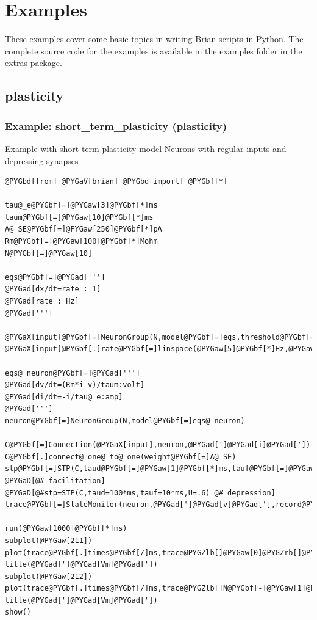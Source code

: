 \documentclass[letterpaper,10pt,english]{manual}
\begin{document}
\section{Examples}

These examples cover some basic topics in writing Brian scripts in Python. The
complete source code for the examples is available in the examples folder
in the extras package.


\subsection{plasticity}

\resetcurrentobjects
\hypertarget{--doc-examples-plasticity_short_term_plasticity}{}

\hypertarget{index-99}{}\subsubsection{Example: short\_term\_plasticity (plasticity)}

Example with short term plasticity model
Neurons with regular inputs and depressing synapses

\begin{Verbatim}[commandchars=@\[\]]
@PYGbd[from] @PYGaV[brian] @PYGbd[import] @PYGbf[*]

tau@_e@PYGbf[=]@PYGaw[3]@PYGbf[*]ms
taum@PYGbf[=]@PYGaw[10]@PYGbf[*]ms
A@_SE@PYGbf[=]@PYGaw[250]@PYGbf[*]pA
Rm@PYGbf[=]@PYGaw[100]@PYGbf[*]Mohm
N@PYGbf[=]@PYGaw[10]

eqs@PYGbf[=]@PYGad[''']
@PYGad[dx/dt=rate : 1]
@PYGad[rate : Hz]
@PYGad[''']

@PYGaX[input]@PYGbf[=]NeuronGroup(N,model@PYGbf[=]eqs,threshold@PYGbf[=]@PYGaw[1.],reset@PYGbf[=]@PYGaw[0])
@PYGaX[input]@PYGbf[.]rate@PYGbf[=]linspace(@PYGaw[5]@PYGbf[*]Hz,@PYGaw[30]@PYGbf[*]Hz,N)

eqs@_neuron@PYGbf[=]@PYGad[''']
@PYGad[dv/dt=(Rm*i-v)/taum:volt]
@PYGad[di/dt=-i/tau@_e:amp]
@PYGad[''']
neuron@PYGbf[=]NeuronGroup(N,model@PYGbf[=]eqs@_neuron)

C@PYGbf[=]Connection(@PYGaX[input],neuron,@PYGad[']@PYGad[i]@PYGad['])
C@PYGbf[.]connect@_one@_to@_one(weight@PYGbf[=]A@_SE)
stp@PYGbf[=]STP(C,taud@PYGbf[=]@PYGaw[1]@PYGbf[*]ms,tauf@PYGbf[=]@PYGaw[100]@PYGbf[*]ms,U@PYGbf[=]@PYGbf[.]@PYGaw[1]) @PYGaD[@# facilitation]
@PYGaD[@#stp=STP(C,taud=100*ms,tauf=10*ms,U=.6) @# depression]
trace@PYGbf[=]StateMonitor(neuron,@PYGad[']@PYGad[v]@PYGad['],record@PYGbf[=]@PYGZlb[]@PYGaw[0],N@PYGbf[-]@PYGaw[1]@PYGZrb[])

run(@PYGaw[1000]@PYGbf[*]ms)
subplot(@PYGaw[211])
plot(trace@PYGbf[.]times@PYGbf[/]ms,trace@PYGZlb[]@PYGaw[0]@PYGZrb[]@PYGbf[/]mV)
title(@PYGad[']@PYGad[Vm]@PYGad['])
subplot(@PYGaw[212])
plot(trace@PYGbf[.]times@PYGbf[/]ms,trace@PYGZlb[]N@PYGbf[-]@PYGaw[1]@PYGZrb[]@PYGbf[/]mV)
title(@PYGad[']@PYGad[Vm]@PYGad['])
show()
\end{Verbatim}
\end{document}
